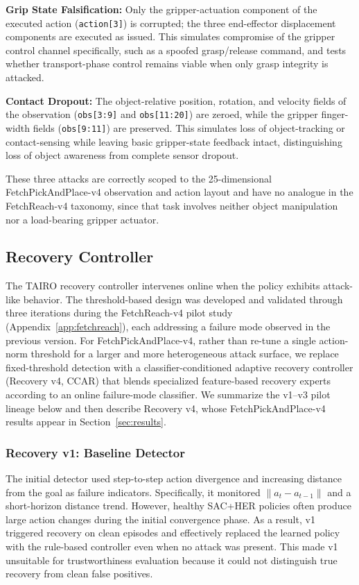 \documentclass[conference]{IEEEtran}
\begin{document}
\textbf{Grip State Falsification:} Only the gripper-actuation component of the
executed action (\texttt{action[3]}) is corrupted; the three end-effector displacement
components are executed as issued. This simulates compromise of the gripper control
channel specifically, such as a spoofed grasp/release command, and tests whether
transport-phase control remains viable when only grasp integrity is attacked.

\textbf{Contact Dropout:} The object-relative position, rotation, and velocity fields
of the observation (\texttt{obs[3:9]} and \texttt{obs[11:20]}) are zeroed, while the
gripper finger-width fields (\texttt{obs[9:11]}) are preserved. This simulates loss of
object-tracking or contact-sensing while leaving basic gripper-state feedback intact,
distinguishing loss of object awareness from complete sensor dropout.

These three attacks are correctly scoped to the 25-dimensional FetchPickAndPlace-v4
observation and action layout and have no analogue in the FetchReach-v4 taxonomy, since
that task involves neither object manipulation nor a load-bearing gripper actuator.

\subsection{Recovery Controller}

The TAIRO recovery controller intervenes online when the policy exhibits attack-like
behavior. The threshold-based design was developed and validated through three iterations
during the FetchReach-v4 pilot study (Appendix~\ref{app:fetchreach}), each addressing a
failure mode observed in the previous version. For FetchPickAndPlace-v4, rather than
re-tune a single action-norm threshold for a larger and more heterogeneous attack
surface, we replace fixed-threshold detection with a classifier-conditioned adaptive
recovery controller (Recovery v4, CCAR) that blends specialized feature-based recovery
experts according to an online failure-mode classifier. We summarize the v1--v3 pilot
lineage below and then describe Recovery v4, whose FetchPickAndPlace-v4 results appear in
Section~\ref{sec:results}.

\subsubsection{Recovery v1: Baseline Detector}

The initial detector used step-to-step action divergence and increasing distance from
the goal as failure indicators. Specifically, it monitored
$\lVert a_t-a_{t-1}\rVert$ and a short-horizon distance trend. However, healthy
SAC+HER policies often produce large action changes during the initial convergence
phase. As a result, v1 triggered recovery on clean episodes and effectively replaced
the learned policy with the rule-based controller even when no attack was present. This
made v1 unsuitable for trustworthiness evaluation because it could not distinguish
true recovery from clean false positives.
\end{document}

